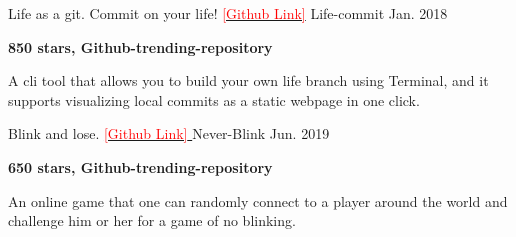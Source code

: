

\begin{cventries}

  \cventry
    {Life as a git. Commit on your life! \href{https://github.com/ByronHsu/life-commit}{\textcolor{red}{[Github Link]}}} %
    {Life-commit} %
    {} %
    {Jan. 2018} %
    {
      \begin{cvitems} %
        \item {\textbf{850 stars, Github-trending-repository} }
        \item {A cli tool that allows you to build your own life branch using Terminal, and it supports visualizing local commits as a static webpage in one click.}
      \end{cvitems}
    }


  \cventry
    {Blink and lose. \href{https://github.com/ByronHsu/Never-Blink}{ \textcolor{red}{[Github Link]} }} %
    {Never-Blink} %
    {} %
    {Jun. 2019} %
    {
      \begin{cvitems} %
        \item {\textbf{650 stars, Github-trending-repository}}
        \item {An online game that one can randomly connect to a player around the world and challenge him or her for a game of no blinking.}      \end{cvitems}
    }

\end{cventries}
